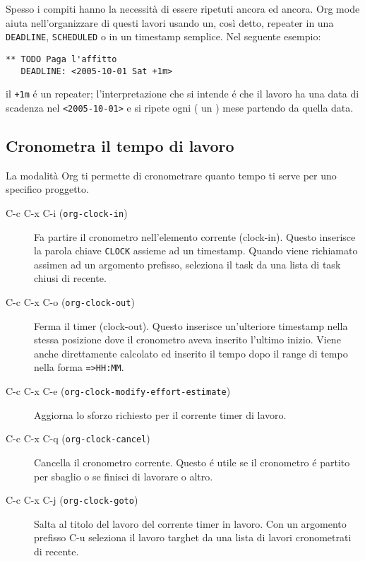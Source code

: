 \documentclass[11pt]{article}
\begin{document}
Spesso i compiti hanno la necessità di essere ripetuti ancora ed
ancora. Org mode aiuta nell'organizzare di questi lavori usando un, così
detto, repeater in una \texttt{DEADLINE}, \texttt{SCHEDULED} o in un timestamp
semplice. Nel seguente esempio:

\begin{verbatim}
** TODO Paga l'affitto
   DEADLINE: <2005-10-01 Sat +1m>
\end{verbatim}

il \texttt{+1m} é un repeater; l'interpretazione che si intende é che il
lavoro ha una data di scadenza nel \texttt{<2005-10-01>} e si ripete ogni (
un ) mese partendo da quella data.

\subsection{Cronometra il tempo di lavoro}
\label{sec:orgc68efae}
La modalità Org ti permette di cronometrare quanto tempo ti serve per
uno specifico proggetto.

\begin{description}
\item[{C-c C-x C-i (\texttt{org-clock-in})}] Fa partire il cronometro nell'elemento corrente (clock-in). Questo
inserisce la parola chiave \texttt{CLOCK} assieme ad un timestamp. Quando
viene richiamato assimen ad un argomento prefisso, seleziona il task
da una lista di task chiusi di recente.

\item[{C-c C-x C-o (\texttt{org-clock-out})}] Ferma il timer (clock-out). Questo inserisce un'ulteriore timestamp
nella stessa posizione dove il cronometro aveva inserito l'ultimo
inizio. Viene anche direttamente calcolato ed inserito il tempo dopo
il range di tempo nella forma \texttt{=>HH:MM}.

\item[{C-c C-x C-e (\texttt{org-clock-modify-effort-estimate})}] Aggiorna lo sforzo richiesto per il corrente timer di lavoro.

\item[{C-c C-x C-q (\texttt{org-clock-cancel})}] Cancella il cronometro corrente. Questo é utile se il cronometro é
partito per sbaglio o se finisci di lavorare o altro.

\item[{C-c C-x C-j (\texttt{org-clock-goto})}] Salta al titolo del lavoro del corrente timer in lavoro. Con un argomento
prefisso C-u seleziona il lavoro targhet da una lista di lavori
cronometrati di recente.
\end{description}
\end{document}
